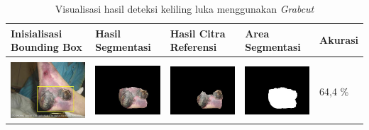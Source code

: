 \begin{table}[H]
	\centering
	\caption{Visualisasi hasil deteksi keliling luka menggunakan \emph{Grabcut}}
	\label{tabel_hasil_2}
	\begin{tabular}{|m{1.1in}|m{1.1in}|m{1.1in}|m{1.1in}|m{0.7in}|}
		\hline
		\textbf{Inisialisasi Bounding Box} & \textbf{Hasil Segmentasi} & \textbf{Hasil Citra Referensi} & \textbf{Area Segmentasi} & \textbf{Akurasi} \\
		\hline
		
		&  &  & \\
		\includegraphics[width=1.1in]{gambar/hasil_segmentasi/luka_hitam/image_8_rect.jpg} \fontsize{8}{12}{(114, 104, 157, 108)}&
		\includegraphics[width=1.1in]{gambar/hasil_segmentasi/luka_hitam/result_8.jpg}&
		\includegraphics[width=1.1in]{gambar/hasil_segmentasi/luka_hitam/result_8_cv.jpg}&
		\includegraphics[width=1.1in]{gambar/hasil_segmentasi/luka_hitam/mask_8.jpg}&
		64,4 \% \\
		\hline
		

\end{tabular}
\end{table}
